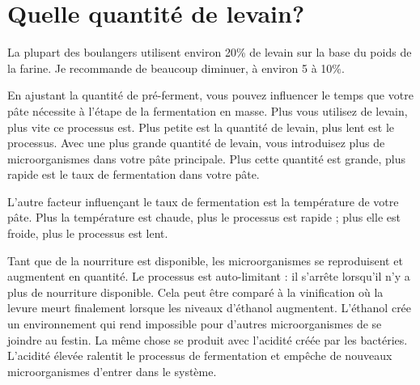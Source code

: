 \section{Quelle quantité de levain?}

La plupart des boulangers utilisent environ 20\% de levain sur la base du
poids de la farine.  Je recommande de beaucoup diminuer,
à environ 5 à 10\%.

En ajustant la quantité de pré-ferment, vous pouvez influencer le temps que votre pâte
nécessite à l'étape de la fermentation en masse. Plus vous utilisez de levain, plus vite
ce processus est. Plus petite est la quantité de levain, plus lent est le processus. Avec une plus grande
quantité de levain, vous introduisez plus de microorganismes dans votre pâte principale.
Plus cette quantité est grande, plus rapide est le taux de fermentation dans votre
pâte.

L'autre facteur influençant le taux de fermentation est la température de
votre pâte. Plus la température est chaude, plus le processus est rapide ; plus elle est froide, plus
le processus est lent.

Tant que de la nourriture est disponible, les microorganismes se reproduisent et augmentent en
quantité. Le processus est auto-limitant : il s'arrête lorsqu'il n'y a plus
de nourriture disponible. Cela peut être comparé à la vinification où
la levure meurt finalement lorsque les niveaux d'éthanol augmentent. L'éthanol crée un
environnement qui rend impossible pour d'autres
microorganismes de se joindre au festin. La même chose se produit avec l'acidité
créée par les bactéries. L'acidité élevée ralentit le processus de fermentation et
empêche de nouveaux microorganismes d'entrer dans le système.

